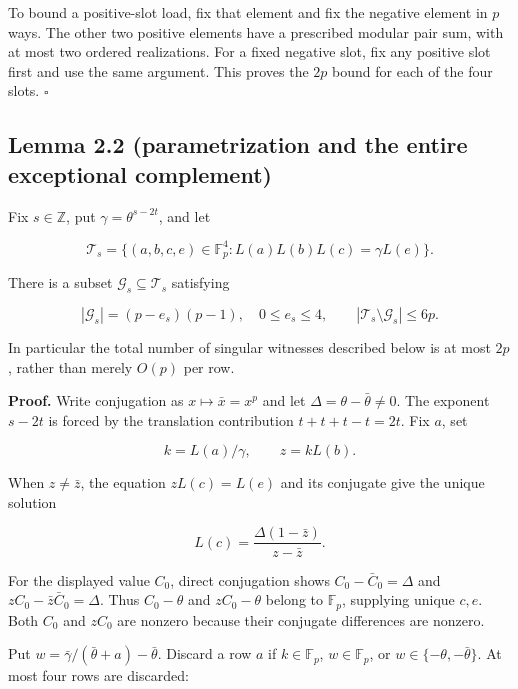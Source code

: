 \documentclass[11pt,a4paper]{article}
\begin{document}
To bound a positive-slot load, fix that element and fix the negative element in \(p\) ways. The other two positive elements have a prescribed modular pair sum, with at most two ordered realizations. For a fixed negative slot, fix any positive slot first and use the same argument. This proves the \(2p\) bound for each of the four slots. \hfill\(\square\)

\subsection{Lemma 2.2 (parametrization and the entire exceptional complement)}\label{lemma-2.2-parametrization-and-the-entire-exceptional-complement}

Fix \(s\in\mathbb Z\), put \(\gamma=\theta^{s-2t}\), and let

\[\mathcal T_s=\{(a,b,c,e)\in\mathbb F_p^4:
                  L(a)L(b)L(c)=\gamma L(e)\}.\]

There is a subset \(\mathcal G_s\subseteq\mathcal T_s\) satisfying

\[|\mathcal G_s|=(p-e_s)(p-1),\quad 0\le e_s\le4,\qquad
|\mathcal T_s\setminus\mathcal G_s|\le6p.
\tag{10}\]

In particular the total number of singular witnesses described below is at most \(2p\), rather than merely \(O(p)\) per row.

\textbf{Proof.} Write conjugation as \(x\mapsto\bar x=x^p\) and let \(\Delta=\theta-\bar\theta\ne0\). The exponent \(s-2t\) is forced by the translation contribution \(t+t+t-t=2t\). Fix \(a\), set

\[k=L(a)/\gamma,\qquad z=kL(b).\]

When \(z\ne\bar z\), the equation \(zL(c)=L(e)\) and its conjugate give the unique solution

\[L(c)=\frac{\Delta(1-\bar z)}{z-\bar z}.
\tag{11}\]

For the displayed value \(C_0\), direct conjugation shows \(C_0-\bar C_0=\Delta\) and \(zC_0-\bar z\bar C_0=\Delta\). Thus \(C_0-\theta\) and \(zC_0-\theta\) belong to \(\mathbb F_p\), supplying unique \(c,e\). Both \(C_0\) and \(zC_0\) are nonzero because their conjugate differences are nonzero.

Put \(w=\bar\gamma/(\bar\theta+a)-\bar\theta\). Discard a row \(a\) if \(k\in\mathbb F_p\), \(w\in\mathbb F_p\), or \(w\in\{-\theta,-\bar\theta\}\). At most four rows are discarded:
\end{document}
